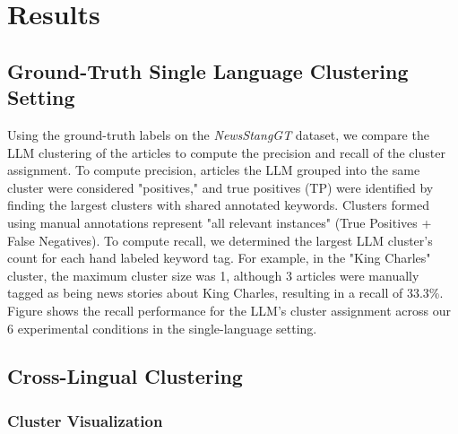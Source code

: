 \section{Results}\label{section:results}

\subsection{Ground-Truth Single Language Clustering Setting}


Using the ground-truth labels on the \emph{NewsStangGT} dataset, we compare the LLM clustering of the articles to compute the precision and recall of the cluster assignment. 
To compute precision, articles the LLM grouped into the same cluster were considered "positives," and true positives (TP) were identified by finding the largest clusters with shared annotated keywords. 
Clusters formed using manual annotations represent "all relevant instances" (True Positives + False Negatives). 
To compute recall, we determined the largest LLM cluster's count for each hand labeled keyword tag. 
For example, in the "King Charles" cluster, the maximum cluster size was 1, although 3 articles were manually tagged as being news stories about King Charles, resulting in a recall of 33.3\%. 
Figure  shows the recall performance for the LLM's cluster assignment across our 6 experimental conditions in the single-language setting. 





\subsection{Cross-Lingual Clustering}

\subsubsection{Cluster Visualization}


